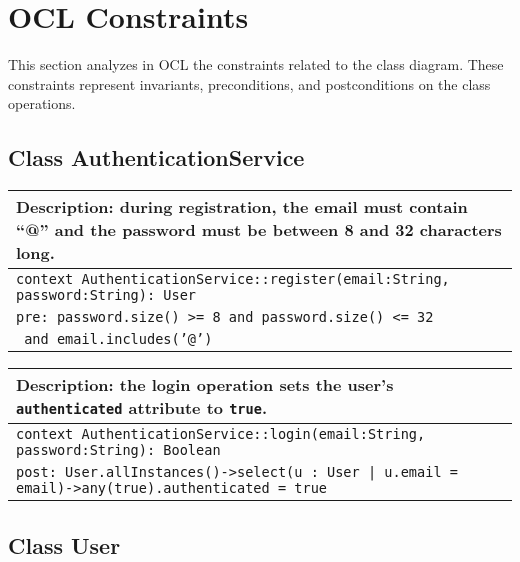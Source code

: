 \section{OCL Constraints}

This section analyzes in OCL the constraints related to the class diagram.  
These constraints represent invariants, preconditions, and postconditions on the class operations.

\subsection{Class AuthenticationService}

\begin{table}[ht]
  \centering
  \begin{tabular}{p{}}
    \hline
    \textbf{Description:} during registration, the email must contain “@” and the password must be between 8 and 32 characters long.\\
    \hline
    \texttt{context AuthenticationService::register(email:String, password:String): User}\\
    \texttt{pre: password.size() >= 8 and password.size() <= 32}\\
    \texttt{     and email.includes('@')}\\
    \hline
  \end{tabular}
\end{table}

\begin{table}[ht]
  \centering
  \begin{tabular}{p{}}
    \hline
    \textbf{Description:} the login operation sets the user's \texttt{authenticated} attribute to \texttt{true}.\\
    \hline
    \texttt{context AuthenticationService::login(email:String, password:String): Boolean}\\
    \texttt{post: User.allInstances()->select(u : User | u.email = email)->any(true).authenticated = true}\\
    \hline
  \end{tabular}
\end{table}

\subsection{Class User}

